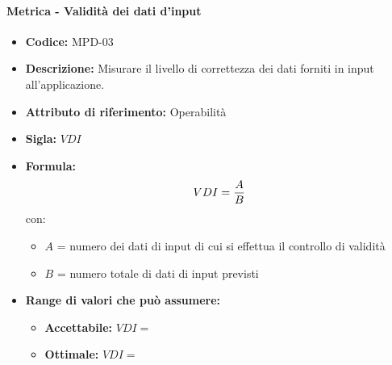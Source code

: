 	 \paragraph{Metrica - Validità dei dati d'input} 
	    \begin{itemize}
          \item  \textbf{Codice: } MPD-03
           \item \textbf{Descrizione:} Misurare il livello di correttezza dei dati forniti in input all'applicazione.
         \item   \textbf{Attributo di riferimento:} Operabilità
          \item  \textbf{Sigla:} $VDI$
         \item   \textbf{Formula:} $$VDI = {A \over B}$$
            con:
            \begin{itemize}
                \item $A$ = numero dei dati di input di cui si effettua il controllo di validità 
                \item $B$ = numero totale di dati di input previsti
            \end{itemize}
             
        \item \textbf{Range di valori che può assumere:}
        \begin{itemize}
            \item \textbf{Accettabile:} $VDI = $
            \item \textbf{Ottimale:} $VDI = $
        \end{itemize}
       \end{itemize}
              
                
